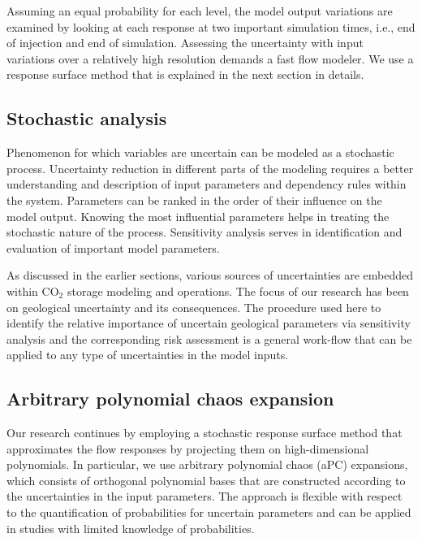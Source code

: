 Assuming an equal probability for each level, the model output variations are
examined by looking at each response at two important simulation times, i.e., end of injection and end of simulation. Assessing the uncertainty with input variations over a relatively high resolution demands a fast flow modeler. We use a response surface method that is explained in the next section in details. 

\subsection{Stochastic analysis}

Phenomenon for which variables are uncertain can be modeled as a stochastic process. Uncertainty reduction in different parts of the modeling requires a better understanding and description of input parameters and dependency rules within
the system. Parameters can be ranked in the order of their influence on the
model output. Knowing the most influential parameters helps in treating the
stochastic nature of the process. Sensitivity analysis serves in identification and evaluation of important model
parameters. 

As discussed in the earlier sections, various sources of uncertainties are
embedded within $\mbox{CO}_{2}$ storage modeling and operations. The focus of
our research has been on geological uncertainty and its consequences. The
procedure used here to identify the relative importance of uncertain geological
parameters via sensitivity analysis and the corresponding risk assessment is a
general work-flow that can be applied to any type of uncertainties in the model
inputs.

\subsection{Arbitrary polynomial chaos expansion}

Our research continues by employing a stochastic response surface method that approximates the flow responses by projecting them on high-dimensional
polynomials. In particular, we use arbitrary polynomial chaos (aPC) expansions, which consists of orthogonal polynomial bases that are constructed  according
to the uncertainties in the input parameters. The approach is flexible with
respect to the quantification of probabilities for uncertain parameters and can
be applied in studies with limited knowledge of probabilities. 

